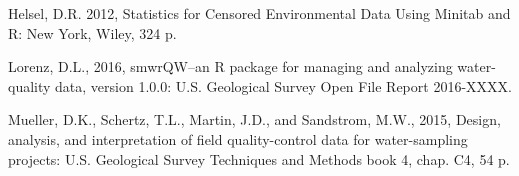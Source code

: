 \documentclass{article}
\begin{document}
\begin{thebibliography}{9}

Helsel, D.R. 2012, Statistics for Censored Environmental Data Using Minitab and R: New York, Wiley, 324 p.

Lorenz, D.L., 2016, smwrQW--an R package for managing and analyzing water-quality data, version 1.0.0: U.S. Geological Survey Open File Report 2016-XXXX.

Mueller, D.K., Schertz, T.L., Martin, J.D., and Sandstrom, M.W., 2015, Design, analysis, and interpretation of field quality-control data for water-sampling projects: U.S. Geological Survey Techniques and Methods book 4, chap. C4, 54 p.

\end{thebibliography}
\end{document}
